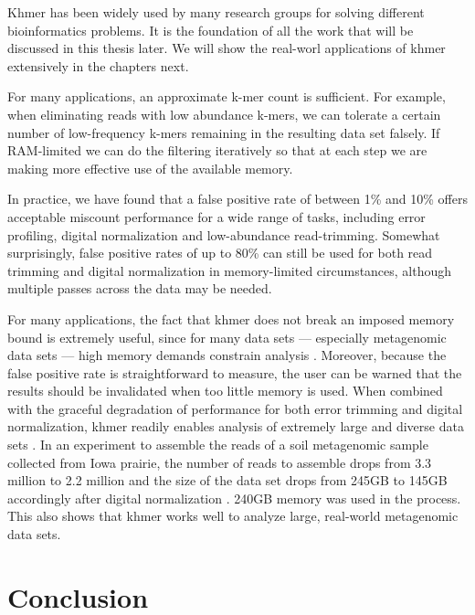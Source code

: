 Khmer has been widely used by many research groups for solving different 
bioinformatics problems. It is the foundation of all the work that
will be discussed in this thesis later. We will show the real-worl 
applications of khmer extensively in the chapters next. 

For many applications, an approximate k-mer count is sufficient.  For
example, when eliminating reads with low abundance k-mers, we can
tolerate a certain number of low-frequency k-mers remaining in the
resulting data set falsely.  If RAM-limited we can do the filtering
iteratively so that at each step we are making more effective use of
the available memory.

In practice, we have found that a false positive rate of between 1\%
and 10\% offers acceptable miscount performance for a wide range of
tasks, including error profiling, digital normalization and
low-abundance read-trimming.  Somewhat surprisingly, false positive rates of up
to 80\% can still be used for both read trimming and digital
normalization in memory-limited circumstances, although multiple
passes across the data may be needed.

For many applications, the fact that khmer does not break an imposed
memory bound is extremely useful, since for many data sets ---
especially metagenomic data sets --- high memory demands constrain
analysis \cite{Howe2012,Luo2009}.  Moreover, because the false
positive rate is straightforward to measure, the user can be warned
that the results should be invalidated when too little memory is used.
When combined with the graceful degradation of performance for both
error trimming and digital normalization, khmer readily enables
analysis of extremely large and diverse data sets \cite{adina2013}. In
an experiment to assemble the reads of a soil metagenomic sample
collected from Iowa prairie, the number of reads to assemble drops
from 3.3 million to 2.2 million and the size of the data set drops from
245GB to 145GB accordingly after digital normalization
\cite{Howe2012}.  240GB memory was used in the process. This also
shows that khmer works well to analyze large, real-world metagenomic data
sets.





\section{Conclusion}

